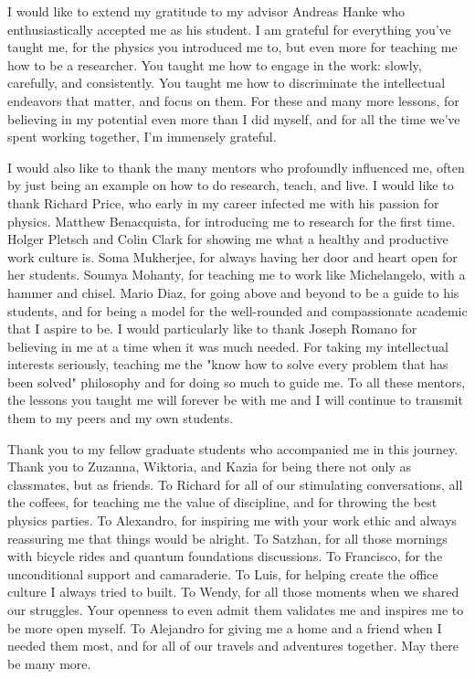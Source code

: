     
I would like to extend my gratitude to my advisor Andreas Hanke who enthusiastically accepted me as his student. I am grateful for everything you've taught me, for the physics you introduced me to, but even more for teaching me how to be a researcher. You taught me how to engage in the work: slowly, carefully, and consistently. You taught me how to discriminate the intellectual endeavors that matter, and focus on them. For these and many more lessons, for believing in my potential even more than I did myself, and for all the time we've spent working together, I'm immensely grateful.

I would also like to thank the many mentors who profoundly influenced me, often by just being an example on how to do research, teach, and live. I would like to thank Richard Price, who early in my career infected me with his passion for physics. Matthew Benacquista, for introducing me to research for the first time. Holger Pletsch and Colin Clark for showing me what a healthy and productive work culture is. Soma Mukherjee, for always having her door and heart open for her students. Soumya Mohanty, for teaching me to work like Michelangelo, with a hammer and chisel. Mario Diaz, for going above and beyond to be a guide to his students, and for being a model for the well-rounded and compassionate academic that I aspire to be. I would particularly like to thank Joseph Romano for believing in me at a time when it was much needed. For taking my intellectual interests seriously, teaching me the "know how to solve every problem that has been solved" philosophy and for doing so much to guide me. To all these mentors, the lessons you taught me will forever be with me and I will continue to transmit them to my peers and my own students.

\newpage
Thank you to my fellow graduate students who accompanied me in this journey. Thank you to Zuzanna, Wiktoria, and Kazia for being there not only as classmates, but as friends. To Richard for all of our stimulating conversations, all the coffees, for teaching me the value of discipline, and for throwing the best physics parties. To Alexandro, for inspiring me with your work ethic and always reassuring me that things would be alright. To Satzhan, for all those mornings with bicycle rides and quantum foundations discussions. To Francisco, for the unconditional support and camaraderie. To Luis, for helping create the office culture I always tried to built. To Wendy, for all those moments when we shared our struggles. Your openness to even admit them validates me and inspires me to be more open myself. To Alejandro for giving me a home and a friend when I needed them most, and for all of our travels and adventures together. May there be many more.

